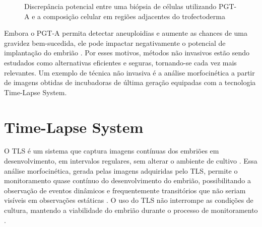 \begin{figure}[h]
\begin{minipage}{\linewidth}
    \caption{Discrepância potencial entre uma biópsia de células utilizando PGT-A e a composição celular em regiões adjacentes do trofectoderma}
    \end{minipage}
\end{figure}
\FloatBarrier

Embora o PGT-A permita detectar aneuploidias e aumente as chances de uma gravidez bem-sucedida, ele pode impactar negativamente o potencial de implantação do embrião \cite{gleicher2021}. Por esses motivos, métodos não invasivos estão sendo estudados como alternativas eficientes e seguras, tornando-se cada vez mais relevantes. Um exemplo de técnica não invasiva é a análise morfocinética a partir de imagens obtidas de incubadoras de última geração equipadas com a tecnologia Time-Lapse System.

\section{Time-Lapse System}

O TLS é um sistema que captura imagens contínuas dos embriões em desenvolvimento, em intervalos regulares, sem alterar o ambiente de cultivo \cite{moustakli2024}. Essa análise morfocinética, gerada pelas imagens adquiridas pelo TLS, permite o monitoramento quase contínuo do desenvolvimento do embrião, possibilitando a observação de eventos dinâmicos e frequentemente transitórios que não seriam visíveis em observações estáticas \cite{boucret2021}. O uso do TLS não interrompe as condições de cultura, mantendo a viabilidade do embrião durante o processo de monitoramento \cite{moustakli2024}.

